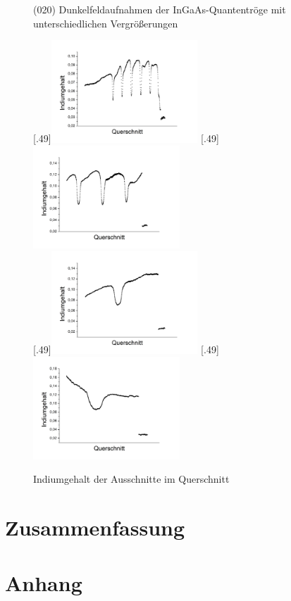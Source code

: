 \documentclass[a4paper,11pt,DIV=11]{scrartcl}
\begin{document}
\begin{figure}[htb]
	\caption{(020) Dunkelfeldaufnahmen der InGaAs-Quantentröge mit unterschiedlichen Vergrößerungen} \label{*}
\end{figure}

\begin{figure}[htb]\centering
	[.49\linewidth]{\includegraphics[width=0.49\textwidth]{Versuchsdaten/11/34000xausschnitt.png}}
	[.49\linewidth]{\includegraphics[width=0.49\textwidth]{Versuchsdaten/11/87000xausschnitt.png}}\\
	[.49\linewidth]{\includegraphics[width=0.49\textwidth]{Versuchsdaten/11/185000xausschnitt.png}}
	[.49\linewidth]{\includegraphics[width=0.49\textwidth]{Versuchsdaten/11/380000xausschnitt.png}}
	\caption{Indiumgehalt der Ausschnitte im Querschnitt} \label{ausschnitte}
\end{figure}

\section{Zusammenfassung}

\section*{Anhang}
\end{document}
